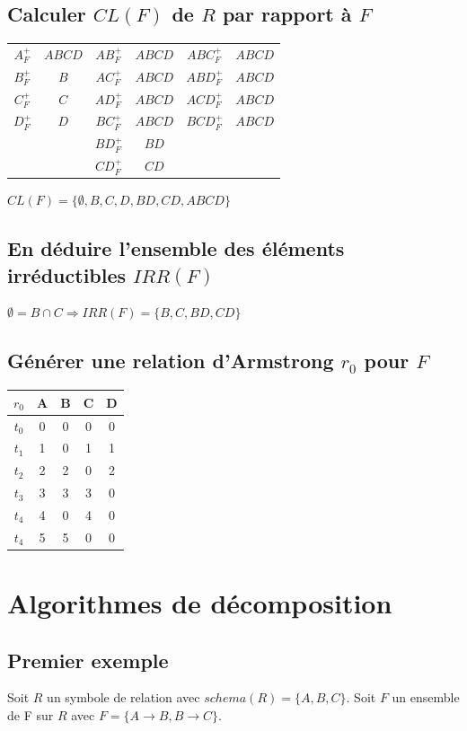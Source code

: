 \documentclass[10pt,a4paper,twoside]{article}
\begin{document}
\subsection{Calculer $CL(F)$ de $R$ par rapport à $F$}
\begin{flushleft}
\begin{tabular}{c|c||c|c||c|c}
$A^{+}_{F}$ & $ABCD$ & $AB^{+}_{F}$ & $ABCD$ & $ABC^{+}_{F}$ & $ABCD$ \\ 
$B^{+}_{F}$ & $B$ & $AC^{+}_{F}$ & $ABCD$ & $ABD^{+}_{F}$ & $ABCD$ \\ 
$C^{+}_{F}$ & $C$ & $AD^{+}_{F}$ & $ABCD$ & $ACD^{+}_{F}$ & $ABCD$\\ 
$D^{+}_{F}$ & $D$ & $BC^{+}_{F}$ & $ABCD$ & $BCD^{+}_{F}$ & $ABCD$\\ 
\multicolumn{2}{c}{} & $BD^{+}_{F}$ & $BD$ & \multicolumn{2}{c}{} \\ 
\multicolumn{2}{c}{} & $CD^{+}_{F}$ & $CD$ & \multicolumn{2}{c}{} \\ 
\end{tabular} 
\end{flushleft}
$CL(F) = \{\emptyset,B,C,D,BD,CD,ABCD\}$

\subsection{En déduire l'ensemble des éléments irréductibles $IRR(F)$}
$\emptyset = B \cap C \Rightarrow IRR(F)=\{B,C,BD,CD\}$
\subsection{Générer une relation d'Armstrong $r_{0}$ pour $F$}
\begin{tabular}{c|cccc}
$r_{0}$ & A & B & C & D \\ 
\hline 
$t_{0}$ & 0 & 0 & 0 & 0 \\ 
$t_{1}$ & 1 & 0 & 1 & 1 \\ 
$t_{2}$ & 2 & 2 & 0 & 2 \\ 
$t_{3}$ & 3 & 3 & 3 & 0 \\ 
$t_{4}$ & 4 & 0 & 4 & 0 \\ 
$t_{4}$ & 5 & 5 & 0 & 0 \\
\end{tabular} 

\section{Algorithmes de décomposition}
\subsection{Premier exemple}
Soit $R$ un symbole de relation avec $schema(R)=\{A,B,C\}$. Soit $F$ un ensemble de F sur $R$ avec $F=\{A\rightarrow B, B\rightarrow C\}$.
\end{document}
